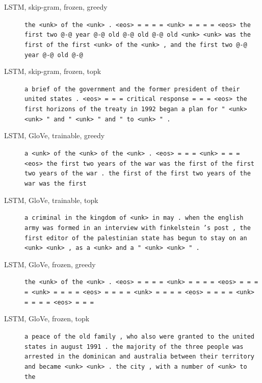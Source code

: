 \begin{description}
\item[LSTM, skip-gram, frozen, greedy] \texttt{\small the \textless{}unk\textgreater{} of the \textless{}unk\textgreater{} . \textless{}eos\textgreater{} = = = = \textless{}unk\textgreater{} = = = = \textless{}eos\textgreater{} the first two @-@ year @-@ old @-@ old @-@ old \textless{}unk\textgreater{} \textless{}unk\textgreater{} was the first of the first \textless{}unk\textgreater{} of the \textless{}unk\textgreater{} , and the first two @-@ year @-@ old @-@}
\item[LSTM, skip-gram, frozen, topk] \texttt{\small a brief of the government and the former president of their united states . \textless{}eos\textgreater{} = = = critical response = = = \textless{}eos\textgreater{} the first horizons of the treaty in 1992 began a plan for " \textless{}unk\textgreater{} \textless{}unk\textgreater{} " and " \textless{}unk\textgreater{} " and " to \textless{}unk\textgreater{} " .}
\item[LSTM, GloVe, trainable, greedy] \texttt{\small a \textless{}unk\textgreater{} of the \textless{}unk\textgreater{} of the \textless{}unk\textgreater{} . \textless{}eos\textgreater{} = = = \textless{}unk\textgreater{} = = = \textless{}eos\textgreater{} the first two years of the war was the first of the first two years of the war . the first of the first two years of the war was the first}
\item[LSTM, GloVe, trainable, topk] \texttt{\small a criminal in the kingdom of \textless{}unk\textgreater{} in may . when the english army was formed in an interview with finkelstein 's post , the first editor of the palestinian state has begun to stay on an \textless{}unk\textgreater{} \textless{}unk\textgreater{} , as a \textless{}unk\textgreater{} and a " \textless{}unk\textgreater{} \textless{}unk\textgreater{} " .}
\item[LSTM, GloVe, frozen, greedy] \texttt{\small the \textless{}unk\textgreater{} of the \textless{}unk\textgreater{} . \textless{}eos\textgreater{} = = = = \textless{}unk\textgreater{} = = = = \textless{}eos\textgreater{} = = = = \textless{}unk\textgreater{} = = = = \textless{}eos\textgreater{} = = = = \textless{}unk\textgreater{} = = = = \textless{}eos\textgreater{} = = = = \textless{}unk\textgreater{} = = = = \textless{}eos\textgreater{} = = =}
\item[LSTM, GloVe, frozen, topk] \texttt{\small a peace of the old family , who also were granted to the united states in august 1991 . the majority of the three people was arrested in the dominican and australia between their territory and became \textless{}unk\textgreater{} \textless{}unk\textgreater{} . the city , with a number of \textless{}unk\textgreater{} to the}
\end{description}
